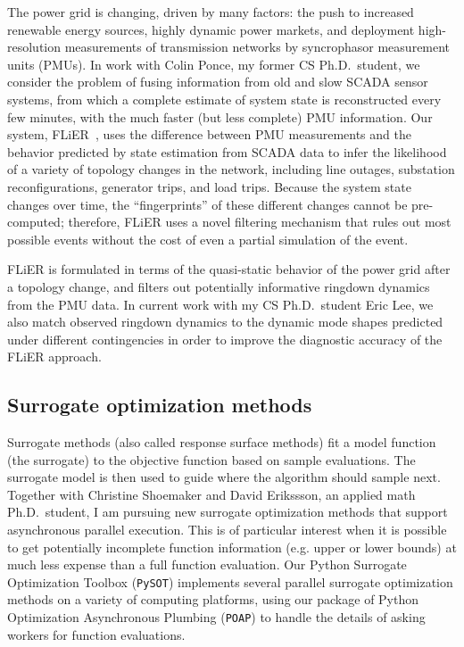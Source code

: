 \documentclass[11pt]{amsart}
\begin{document}
The power grid is changing, driven by many factors: the push to
increased renewable energy sources, highly dynamic power markets, and
deployment high-resolution measurements of transmission networks by
syncrophasor measurement units (PMUs).  In work with Colin Ponce,
my former CS Ph.D.~student, we consider the problem of fusing information
from old and slow SCADA sensor systems, from which a
complete estimate of system state is
reconstructed every few minutes, with the much faster (but less
complete) PMU information.  Our system, FLiER~\cite{2016-flier-tr},
uses the difference between PMU measurements and the
behavior predicted by state estimation from SCADA data to infer
the likelihood of a variety of topology changes in the network,
including line outages, substation reconfigurations, generator
trips, and load trips.  Because the system state changes over
time, the ``fingerprints'' of these different changes cannot be
pre-computed; therefore, FLiER uses a novel filtering mechanism
that rules out most possible events without
the cost of even a partial simulation of the event.

FLiER is formulated in terms of the quasi-static behavior of the
power grid after a topology change, and filters out potentially
informative ringdown dynamics from the PMU data.  In
current work with my CS Ph.D.~student Eric Lee, we also match observed
ringdown dynamics to the dynamic mode shapes predicted under different
contingencies in order to improve the diagnostic accuracy of the FLiER
approach.

\subsection*{Surrogate optimization methods}

Surrogate methods (also called response surface methods) fit a model
function (the surrogate) to the objective function based on sample
evaluations.  The surrogate model is then used to guide where the algorithm
should sample next.  Together with Christine Shoemaker and David
Erikssson, an applied math Ph.D.~student, I am pursuing new surrogate
optimization methods that support asynchronous parallel execution.  This
is of particular interest when it is possible to get potentially
incomplete function information (e.g. upper or lower bounds) at much
less expense than a full function evaluation. Our Python Surrogate
Optimization Toolbox ({\tt PySOT}) implements several parallel surrogate
optimization methods on a variety of computing platforms, using our
package of Python Optimization Asynchronous Plumbing ({\tt POAP}) to
handle the details of asking workers for function evaluations.

\newpage


\end{document}
